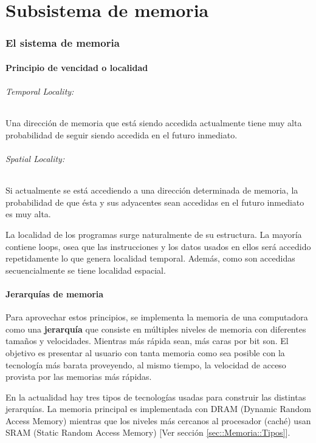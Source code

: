 \part{Subsistema de memoria}
\section{El sistema de memoria}
\subsection{Principio de vencidad o localidad}
\paragraph{Temporal Locality:} Una dirección de memoria que está siendo accedida actualmente tiene muy alta probabilidad de seguir siendo accedida en el futuro inmediato.

\paragraph{Spatial Locality:} Si actualmente se está accediendo a una dirección determinada de memoria, la probabilidad de que ésta y sus adyacentes sean accedidas en el futuro inmediato es muy alta.

La localidad de los programas surge naturalmente de su estructura. La mayoría contiene loops, osea que las instrucciones y los datos usados en ellos será accedido repetidamente lo que genera localidad temporal. Además, como son accedidas secuencialmente se tiene localidad espacial.

\subsection{Jerarquías de memoria}
Para aprovechar estos principios, se implementa la memoria de una computadora como una \textbf{jerarquía} que consiste en múltiples niveles de memoria con diferentes tamaños y velocidades. Mientras más rápida sean, más caras por bit son. El objetivo es presentar al usuario con tanta memoria como sea posible con la tecnología más barata proveyendo, al mismo tiempo, la velocidad de acceso provista por las memorias más rápidas.

En la actualidad hay tres tipos de tecnologías usadas para construir las distintas jerarquías. La memoria principal es implementada con DRAM (Dynamic Random Access Memory) mientras que los niveles más cercanos al procesador (caché) usan SRAM (Static Random Access Memory)  [Ver sección \ref{sec::Memoria::Tipos}].

